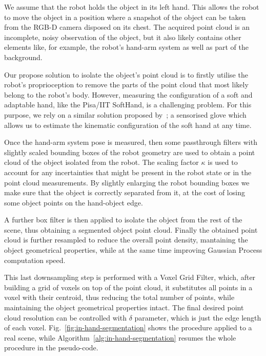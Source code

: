 We assume that the robot holds the object in its left hand. This allows the robot to move the object in a position where a snapshot of the object can be taken from the RGB-D camera disposed on its chest. 
The acquired point cloud is an incomplete, noisy observation of the object, but it also likely contains other elements like, for example, the robot's hand-arm system as well as part of the background. 

Our propose solution to isolate the object's point cloud is to firstly utilise the robot's proprioception to remove the parts of the point cloud that most likely belong to the robot's body. However, measuring  the  configuration of  a  soft and  adaptable hand, like the Pisa/IIT SoftHand, is a challenging problem. For this purpose, we rely on a similar solution proposed by~\citet{Santaera2015Lowcost}; a sensorised glove which allows us to estimate the kinematic configuration of the soft hand at any time.

Once the hand-arm  system pose is measured, then
some   passthrough filters with slightly  scaled bounding boxes of  the robot
geometry  are used  to obtain  a  point cloud  of  the object  isolated from  the
robot. The scaling factor $\kappa$ is used to account for any incertainties that might
be present in the robot state or in the point cloud measurements. 
By slightly enlarging the robot bounding boxes we make sure that the object is correctly
separated from it, at the cost of losing some object points on the hand-object edge.

A further box filter is then applied to isolate the object from the rest of the scene,
thus obtaining a segmented object point cloud. 
Finally the obtained point cloud is further resampled to reduce the overall point
density, mantaining the object geometrical properties, while at the same time
improving Gaussian Process computation speed. 

This last downsampling step is performed with a Voxel Grid Filter, which, after
building a grid of voxels on top of the point cloud, it
substitutes all points in a voxel with their centroid, thus reducing the total number of 
points, while maintaining the object geometrical properties intact. The final desired
point cloud resolution can be controlled with $\delta$ parameter, which is just the edge length of each voxel.
Fig.~\ref{fig:in-hand-segmentation} shows the procedure applied to a real scene,
while  Algorithm~\ref{alg:in-hand-segmentation} resumes  the whole  procedure in
the pseudo-code.

